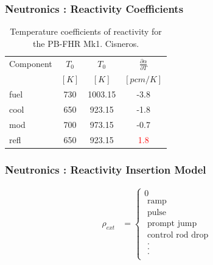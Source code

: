 \begin{frame}[fragile]
  \frametitle{Neutronics : Reactivity Coefficients}
    \begin{table}
      \begin{tabular}{|l|c|c|c|}
        \hline
        Component & $T_{0}$  &  $T_0$ & $\frac{\partial\alpha}{\partial T}$\\
                  & $[K]$    &  $[K]$ & $[pcm/K]$ \\
        \hline
        fuel  & 730 & 1003.15 & -3.8 \\
        cool  & 650 &  923.15 & -1.8 \\
        mod   & 700 &  973.15 & -0.7 \\
        refl  & 650 &  923.15 &  \textcolor{red}{1.8} \\
        \hline
      \end{tabular}
      \caption{Temperature coefficients of reactivity for the PB-FHR Mk1. 
      Cisneros.}
      \label{tab:decayheat}
    \end{table}

\end{frame}


\begin{frame}[fragile]
  \frametitle{Neutronics : Reactivity Insertion Model}
  \begin{align}
    \rho_{ext} &= \left\{
                  \begin{array}{l}
                            0 \\
                            \mbox{ ramp } \\
                            \mbox{ pulse } \\
                            \mbox{ prompt jump }\\
                            \mbox{ control rod drop }\\
                            \mbox{ . } \\
                            \mbox{ . } \\
                            \mbox{ . } \\
                  \end{array}
                  \right.
  \end{align}
\end{frame}

